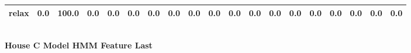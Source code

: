 \documentclass{article}
\begin{document}
\begin{sideways}
\begin{tabular}{lrrrrrrrrrrrrrrrrrr}
relax                         &         0.0 &              100.0 &           0.0 &                          0.0 &                0.0 &                0.0 &                        0.0 &          0.0 &              0.0 &                0.0 &                    0.0 &                      0.0 &                  0.0 &                   0.0 &              0.0 &              0.0 &                                  0.0 &          0.0 \\
\bottomrule
\end{tabular}
\end{sideways}
\normalsize
\vspace{1cm}\\
\textbf{House C Model HMM Feature Last}\\
\vspace{1cm}\\
\end{document}
